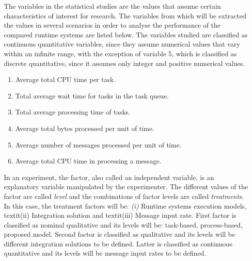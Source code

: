 %

The variables in the statistical studies are the values that assume certain characteristics of interest for research. The variables from which will be extracted the values in several scenarios in order to analyse the performance of the compared runtime systems are listed below. The variables studied are classified as continuous quantitative variables, since they assume numerical values that vary within an infinite range, with the exception of variable 5, which is classified as discrete quantitative, since it assumes only integer and positive numerical values.
\begin{enumerate}
\item Average total CPU time per task.
\item Total average wait time for tasks in the task queue.
\item Total average processing time of tasks.
\item Average total bytes processed per unit of time.
\item Average number of messages processed per unit of time.
\item Average total CPU time in processing a message.
\end{enumerate}
In an experiment, the factor, also called an independent variable, is an explanatory variable manipulated by the experimenter. The different values of the factor are called \textit{level} and the combinations of factor levels are called \textit{treatments}. In this case, the treatment factors will be: \textit{(i)} Runtime systems execution models, textit{(ii)} Integration solution and textit{(iii)} Message input rate. First factor is classified as nominal qualitative and its levels will be: task-based, process-based, proposed model. Second factor is classified as qualitative and its levels will be different integration solutions to be defined. Latter is classified as continuous quantitative and its levels will be message input rates to be defined.
